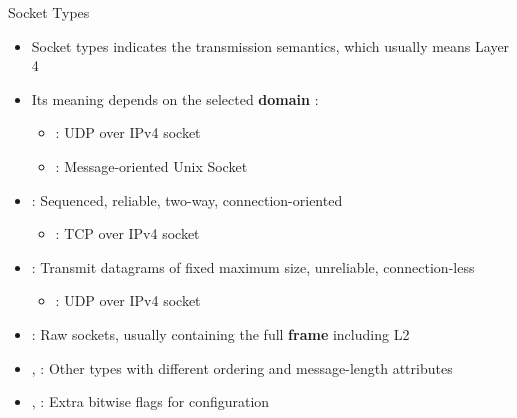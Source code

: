 \begin{frame}{Socket Types}
	\begin{itemize}
		\item Socket types indicates the transmission semantics, which usually means Layer 4
		\item Its meaning depends on the selected \textbf{domain} :
			\begin{itemize}
				\item {} : UDP over IPv4 socket
				\item {} : Message-oriented Unix Socket
			\end{itemize}
		\item {} : Sequenced, reliable, two-way, connection-oriented
			\begin{itemize}
				\item {} : TCP over IPv4 socket
			\end{itemize}
		\item {} : Transmit datagrams of fixed maximum size, unreliable, connection-less
			\begin{itemize}
				\item {} : UDP over IPv4 socket
			\end{itemize}
		\item {} : Raw sockets, usually containing the full \textbf{frame} including L2
		\item {},  : Other types with different ordering and message-length attributes
		\item {},  : Extra bitwise flags for configuration

	\end{itemize}
\end{frame}

